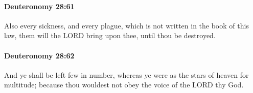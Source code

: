 		\paragraph{Deuteronomy 28:61} %
			\label{DEUTERONOMY-28-61}

			Also every sickness, and every plague, which is not written in the book of this law, them will the LORD bring upon thee, until thou be destroyed.


		\paragraph{Deuteronomy 28:62} %
			\label{DEUTERONOMY-28-62}

			And ye shall be left few in number, whereas ye were as the stars of heaven for multitude; because thou wouldest not obey the voice of the LORD thy God.


